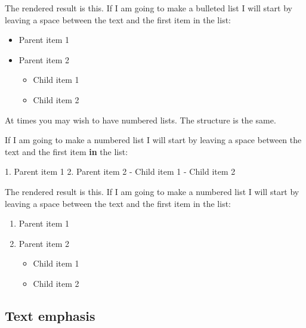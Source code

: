 \documentclass[
]{book}
\newenvironment{Shaded}{\begin{snugshade}}{\end{snugshade}}
\newcommand{\ControlFlowTok}[1]{\textcolor[rgb]{0.13,0.29,0.53}{\textbf{#1}}}
\newcommand{\DecValTok}[1]{\textcolor[rgb]{0.00,0.00,0.81}{#1}}
\newcommand{\FloatTok}[1]{\textcolor[rgb]{0.00,0.00,0.81}{#1}}
\newcommand{\NormalTok}[1]{#1}
\newcommand{\SpecialCharTok}[1]{\textcolor[rgb]{0.00,0.00,0.00}{#1}}
\providecommand{\tightlist}{%
  \setlength{\itemsep}{0pt}\setlength{\parskip}{0pt}}
\begin{document}
The rendered result is this. If I am going to make a bulleted list I will start by leaving a space between the text and the first item in the list:

\begin{itemize}
\tightlist
\item
  Parent item 1
\item
  Parent item 2

  \begin{itemize}
  \tightlist
  \item
    Child item 1
  \item
    Child item 2
  \end{itemize}
\end{itemize}

At times you may wish to have numbered lists. The structure is the same.

\begin{Shaded}
\begin{Highlighting}[]
\NormalTok{If I am going to make a numbered list I will start by leaving a space between the text and the first item }\ControlFlowTok{in}\NormalTok{ the list}\SpecialCharTok{:}
  
\FloatTok{1.}\NormalTok{ Parent item }\DecValTok{1}
\FloatTok{2.}\NormalTok{ Parent item }\DecValTok{2}
   \SpecialCharTok{{-}}\NormalTok{ Child item }\DecValTok{1}
   \SpecialCharTok{{-}}\NormalTok{ Child item }\DecValTok{2}
\end{Highlighting}
\end{Shaded}

The rendered result is this. If I am going to make a numbered list I will start by leaving a space between the text and the first item in the list:

\begin{enumerate}
\def\labelenumi{\arabic{enumi}.}
\tightlist
\item
  Parent item 1
\item
  Parent item 2

  \begin{itemize}
  \tightlist
  \item
    Child item 1
  \item
    Child item 2
  \end{itemize}
\end{enumerate}

\hypertarget{text-emphasis}{%
\subsection{Text emphasis}\label{text-emphasis}}
\end{document}
